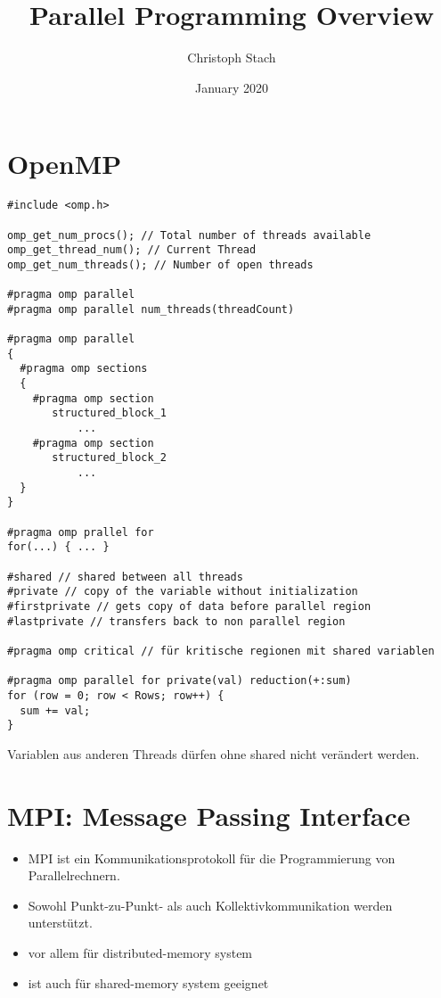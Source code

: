 \documentclass{article}
\title{Parallel Programming Overview}
\author{Christoph Stach}
\date{January 2020}
\begin{document}
\begin{multicols}{2}
    


\section{OpenMP}

\begin{listing}[H]
\begin{verbatim}
#include <omp.h>

omp_get_num_procs(); // Total number of threads available
omp_get_thread_num(); // Current Thread
omp_get_num_threads(); // Number of open threads

#pragma omp parallel
#pragma omp parallel num_threads(threadCount)

#pragma omp parallel
{
  #pragma omp sections
  {
    #pragma omp section
       structured_block_1
           ...
    #pragma omp section
       structured_block_2
           ...
  }
}

#pragma omp prallel for
for(...) { ... }

#shared // shared between all threads
#private // copy of the variable without initialization
#firstprivate // gets copy of data before parallel region
#lastprivate // transfers back to non parallel region

#pragma omp critical // für kritische regionen mit shared variablen

#pragma omp parallel for private(val) reduction(+:sum)
for (row = 0; row < Rows; row++) {
  sum += val;
}
\end{verbatim}
\end{listing}

\noindent Variablen aus anderen Threads dürfen ohne shared nicht verändert werden.

\section{MPI: Message Passing Interface}


\begin{itemize}
    \item MPI ist ein Kommunikationsprotokoll für die Programmierung von Parallelrechnern.
    \item Sowohl Punkt-zu-Punkt- als auch Kollektivkommunikation werden unterstützt.
    \item vor allem für distributed-memory system
    \item ist auch für shared-memory system geeignet
\end{itemize}


\end{multicols}
\end{document}
